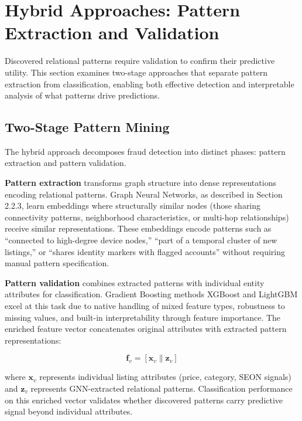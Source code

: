 \section{Hybrid Approaches: Pattern Extraction and Validation}
\label{sec:2_4}

Discovered relational patterns require validation to confirm their predictive utility. This section examines two-stage approaches that separate pattern extraction from classification, enabling both effective detection and interpretable analysis of what patterns drive predictions.

\subsection{Two-Stage Pattern Mining}

The hybrid approach decomposes fraud detection into distinct phases: pattern extraction and pattern validation.

\textbf{Pattern extraction} transforms graph structure into dense representations encoding relational patterns. Graph Neural Networks, as described in Section 2.2.3, learn embeddings where structurally similar nodes (those sharing connectivity patterns, neighborhood characteristics, or multi-hop relationships) receive similar representations. These embeddings encode patterns such as ``connected to high-degree device nodes,'' ``part of a temporal cluster of new listings,'' or ``shares identity markers with flagged accounts'' without requiring manual pattern specification.

\textbf{Pattern validation} combines extracted patterns with individual entity attributes for classification. Gradient Boosting methods XGBoost \cite{chen2016xgboost} and LightGBM \cite{ke2017lightgbm} excel at this task due to native handling of mixed feature types, robustness to missing values, and built-in interpretability through feature importance. The enriched feature vector concatenates original attributes with extracted pattern representations:

\begin{equation}
\mathbf{f}_v = [\mathbf{x}_v \| \mathbf{z}_v]
\end{equation}

where $\mathbf{x}_v$ represents individual listing attributes (price, category, SEON signals) and $\mathbf{z}_v$ represents GNN-extracted relational patterns. Classification performance on this enriched vector validates whether discovered patterns carry predictive signal beyond individual attributes.

